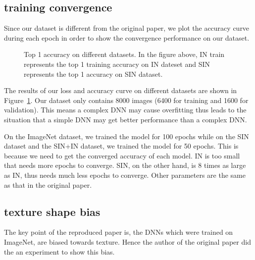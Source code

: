 \documentclass{article} %
\begin{document}
\subsection{training convergence}

Since our dataset is different from the original paper, we plot the accuracy curve during each epoch in order to show the convergence performance on our dataset.

\begin{figure}[!h]
\caption{Top 1 accuracy on different datasets. In the figure above, IN train represents the top 1 training accuracy on IN dateset and SIN represents the top 1 accuracy on SIN dataset.}
\label{converge}
\end{figure}

The results of our loss and accuracy curve on different datasets are shown in Figure~\ref{converge}. Our dataset only contains 8000 images (6400 for training and 1600 for validation). This means a complex DNN may cause overfitting thus leads to the situation that a simple DNN may get better performance than a complex DNN.

On the ImageNet dataset, we trained the model for 100 epochs while on the SIN dataset and the SIN+IN dataset, we trained the model for 50 epochs. This is because we need to get the converged accuracy of each model. IN is too small that needs more epochs to converge. SIN, on the other hand, is 8 times as large as IN, thus needs much less epochs to converge. Other parameters are the same as that in the original paper.

\subsection{texture shape bias}

The key point of the reproduced paper is, the DNNs which were trained on ImageNet, are biased towards texture. Hence the author of the original paper did the an experiment to show this bias.
\end{document}
